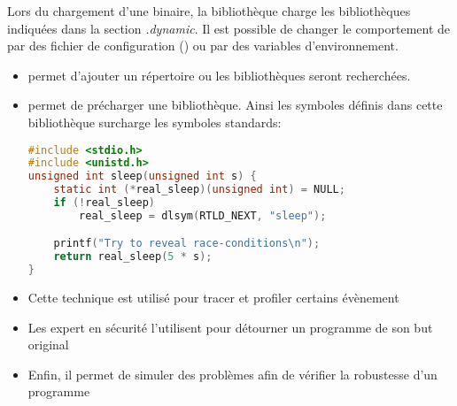 \begin{frame}[fragile=singleslide]{}
  Lors du chargement d'une binaire, la bibliothèque  charge
  les bibliothèques indiquées dans  la section \emph{.dynamic}. Il est
  possible de  changer le comportement de   par des fichier
  de  configuration  ()  ou  par  des  variables
  d'environnement.
  \begin{itemize}
  \item  {} permet d'ajouter  un répertoire  ou les
    bibliothèques seront recherchées.
  \item  {}  permet  de  précharger  une  bibliothèque.
    Ainsi les  symboles définis dans cette  bibliothèque surcharge les
    symboles standards:
    \begin{lstlisting}[language=c]
#include <stdio.h>
#include <unistd.h>
unsigned int sleep(unsigned int s) {
    static int (*real_sleep)(unsigned int) = NULL;
    if (!real_sleep)
        real_sleep = dlsym(RTLD_NEXT, "sleep");

    printf("Try to reveal race-conditions\n");
    return real_sleep(5 * s);
}
    \end{lstlisting}
  \end{itemize}
\end{frame}

\begin{frame}[fragile=singleslide]{}
  \begin{itemize}
    \begin{lstlisting}
host$ gcc -shared -ldl -fPIC mysleep.c -o libmysleep.so
target$ LD_PRELOAD=libmysleep.so ./hello
target$ export LD_PRELOAD=libmysleep.so
taregt$ ./hello
    \end{lstlisting}
  \item Cette  technique est utilisé pour tracer  et profiler certains
    évènement
  \item Les expert en sécurité l'utilisent pour détourner un programme
    de son but original
  \item Enfin, il permet de  simuler des problèmes afin de vérifier la
    robustesse d'un programme
  \end{itemize}
\end{frame}

